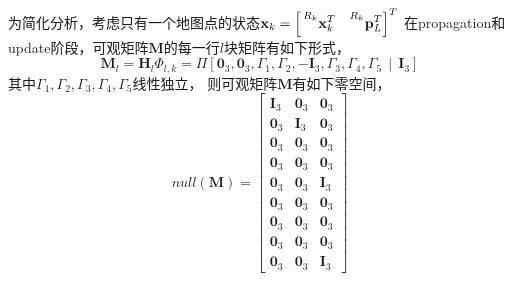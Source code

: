 \documentclass{article}
\begin{document}
\par
为简化分析，考虑只有一个地图点的状态$\textbf{x}_k=\left[\sideset{^{R_k}}{}{\mathop{\textbf{x}_k^T}}
\ \ \sideset{^{R_k}}{}{\mathop{\textbf{p}_L^T}}\right]^T$
在propagation和update阶段，可观矩阵$\textbf{M}$的每一行$l$块矩阵有如下形式，
\begin{equation}
    \textbf{M}_l=\textbf{H}_{l}\Phi_{l,k}
    =\Pi\left[\textbf{0}_{3},\textbf{0}_{3},\Gamma_{1},\Gamma_2,-\textbf{I}_{3},
    \Gamma_3,\Gamma_4,\Gamma_5\ \ |\ \ \textbf{I}_{3}\right]
\end{equation}
其中$\Gamma_{1},\Gamma_{2},\Gamma_{3},\Gamma_{4},\Gamma_{5}$线性独立，
则可观矩阵$\textbf{M}$有如下零空间，
\begin{equation}
    null(\textbf{M})=\left[
        \begin{array}{ccc}
            \textbf{I}_3&\textbf{0}_{3}&\textbf{0}_{3}\\
            \textbf{0}_3&\textbf{I}_{3}&\textbf{0}_{3}\\
            \textbf{0}_3&\textbf{0}_{3}&\textbf{0}_{3}\\
            \textbf{0}_3&\textbf{0}_{3}&\textbf{0}_{3}\\
            \textbf{0}_3&\textbf{0}_{3}&\textbf{I}_{3}\\
            \textbf{0}_3&\textbf{0}_{3}&\textbf{0}_{3}\\
            \textbf{0}_3&\textbf{0}_{3}&\textbf{0}_{3}\\
            \textbf{0}_3&\textbf{0}_{3}&\textbf{0}_{3}\\
            \textbf{0}_3&\textbf{0}_{3}&\textbf{I}_{3}
        \end{array}\right]
\end{equation}
\end{document}

